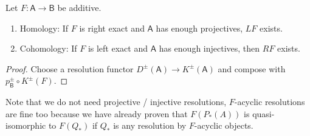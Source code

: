 \documentclass[fontsize=11pt,fleqn,a4paper]{scrartcl}
\begin{document}
\begin{theorem}
Let $F:\mathsf{A}\to\mathsf{B}$ be additive.
\begin{enumerate}
\item Homology: If $F$ is right exact and $\mathsf{A}$ has enough projectives, $LF$ exists.
\item Cohomology: If $F$ is left exact and $\mathsf{A}$ has enough injectives, then $RF$ exists.
\end{enumerate}
\end{theorem}
\begin{proof}
Choose a resolution functor $D^\pm(\mathsf{A}) \to K^\pm(\mathsf{A})$ and compose with $p_\mathsf{B}^\pm\circ K^\pm(F)$.
\end{proof}

\begin{remark}
Note that we do not need projective / injective resolutions, $F$-acyclic resolutions are fine too because we have already proven that $F(P_\ast(A))$ is quasi-isomorphic to $F(Q_\ast)$ if $Q_\ast$ is any resolution by $F$-acyclic objects.
\end{remark}
\end{document}

